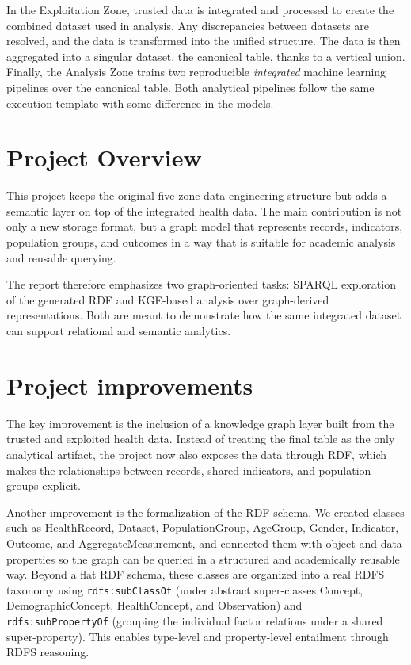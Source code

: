\documentclass[11pt,a4paper]{article}
\begin{document}
In the Exploitation Zone, trusted data is integrated and processed to create the combined dataset used in analysis. Any discrepancies between datasets are resolved, and the data is transformed into the unified structure. The data is then aggregated into a singular dataset, the canonical table, thanks to a vertical union.\\

Finally, the Analysis Zone trains two reproducible \emph{integrated} machine learning pipelines over the canonical table. Both analytical pipelines follow the same execution template with some difference in the models. 

\section{Project Overview}
This project keeps the original five-zone data engineering structure but adds a semantic layer on top of the integrated health data. The main contribution is not only a new storage format, but a graph model that represents records, indicators, population groups, and outcomes in a way that is suitable for academic analysis and reusable querying.

The report therefore emphasizes two graph-oriented tasks: SPARQL exploration of the generated RDF and KGE-based analysis over graph-derived representations. Both are meant to demonstrate how the same integrated dataset can support relational and semantic analytics.

\section{Project improvements}
The key improvement is the inclusion of a knowledge graph layer built from the trusted and exploited health data. Instead of treating the final table as the only analytical artifact, the project now also exposes the data through RDF, which makes the relationships between records, shared indicators, and population groups explicit.

Another improvement is the formalization of the RDF schema. We created classes such as HealthRecord, Dataset, PopulationGroup, AgeGroup, Gender, Indicator, Outcome, and AggregateMeasurement, and connected them with object and data properties so the graph can be queried in a structured and academically reusable way. Beyond a flat RDF schema, these classes are organized into a real RDFS taxonomy using \texttt{rdfs:subClassOf} (under abstract super-classes Concept, DemographicConcept, HealthConcept, and Observation) and \texttt{rdfs:subPropertyOf} (grouping the individual factor relations under a shared super-property). This enables type-level and property-level entailment through RDFS reasoning.
\end{document}
